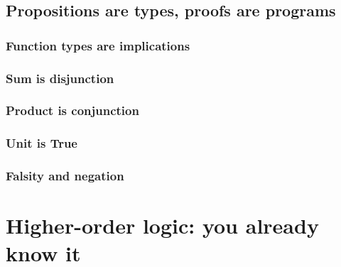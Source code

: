 \documentclass{beamer}
\begin{document}
\subsection{Propositions are types, proofs are programs}

\subsubsection{Function types are implications}
\subsubsection{Sum is disjunction}
\subsubsection{Product is conjunction}
\subsubsection{Unit is True}

\subsubsection{Falsity and negation}





\section{Higher-order logic: you already know it}
\end{document}
